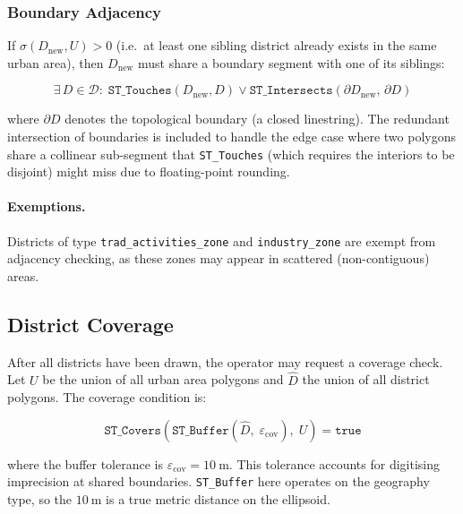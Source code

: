 \documentclass[12pt,a4paper]{article}
\theoremstyle{definition}
\theoremstyle{plain}
\theoremstyle{remark}
\begin{document}
\subsubsection{Boundary Adjacency}

If $\sigma(D_{\text{new}}, U) > 0$ (i.e.\ at least one sibling district
already exists in the same urban area), then $D_{\text{new}}$ must share a
boundary segment with one of its siblings:

\begin{equation}
  \exists\, D \in \mathcal{D}:\;
  \texttt{ST\_Touches}(D_{\text{new}}, D) \lor
  \texttt{ST\_Intersects}(\partial D_{\text{new}},\, \partial D)
  \label{eq:district_adjacency}
\end{equation}

where $\partial D$ denotes the topological boundary (a closed linestring).
The redundant intersection of boundaries is included to handle the edge
case where two polygons share a collinear sub-segment that
\texttt{ST\_Touches} (which requires the interiors to be disjoint) might
miss due to floating-point rounding.

\paragraph{Exemptions.}
Districts of type \texttt{trad\_activities\_zone} and
\texttt{industry\_zone} are exempt from adjacency checking, as these zones
may appear in scattered (non-contiguous) areas.

\subsection{District Coverage}
\label{sec:coverage}

After all districts have been drawn, the operator may request a coverage
check. Let $U$ be the union of all urban area polygons and $\hat{D}$ the
union of all district polygons. The coverage condition is:

\begin{equation}
  \texttt{ST\_Covers}\!\left(
    \texttt{ST\_Buffer}\!\left(\hat{D},\; \varepsilon_{\text{cov}}\right),\; U
  \right) = \texttt{true}
  \label{eq:coverage}
\end{equation}

where the buffer tolerance is $\varepsilon_{\text{cov}} = 10\ \mathrm{m}$.
This tolerance accounts for digitising imprecision at shared boundaries.
\texttt{ST\_Buffer} here operates on the geography type, so the $10\ \mathrm{m}$
is a true metric distance on the ellipsoid.
\end{document}
